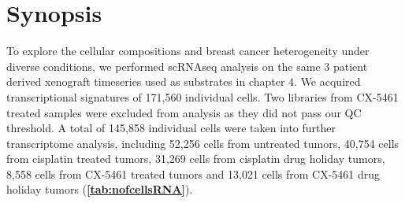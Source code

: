

 \section{Synopsis}

 
To explore the cellular compositions and breast cancer heterogeneity under diverse conditions, we performed scRNAseq analysis on the same 3 patient derived xenograft timeseries used as substrates in chapter 4. We acquired transcriptional signatures of 171,560 individual cells. Two libraries from CX-5461 treated samples were excluded from analysis as they did not pass our QC threshold. A total of 145,858 individual cells were taken into further transcriptome analysis, including  52,256 cells from untreated tumors, 40,754 cells from cisplatin treated tumors, 31,269 cells from cisplatin drug holiday tumors, 8,558 cells from CX-5461 treated tumors and 13,021 cells from CX-5461 drug holiday tumors (\textbf{\autoref{tab:nofcellsRNA}}).

 

 


